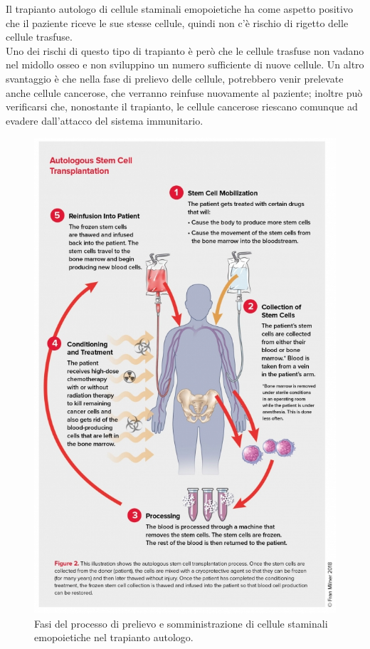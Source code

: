 Il trapianto autologo di cellule staminali emopoietiche ha come aspetto positivo che il paziente riceve le sue 
stesse cellule, quindi non c’è rischio di rigetto delle cellule trasfuse.\\ 
Uno dei rischi di questo tipo di trapianto è però che le cellule trasfuse non vadano nel midollo osseo e non 
sviluppino un numero sufficiente di nuove cellule\cite{STEMCELLS}. Un altro svantaggio è che nella fase di prelievo delle 
cellule, potrebbero venir prelevate anche cellule cancerose, che verranno reinfuse nuovamente al paziente; inoltre può 
verificarsi che, nonostante il trapianto, le cellule cancerose riescano comunque ad evadere dall’attacco 
del sistema immunitario\cite{STEMCELLS}.

\begin{figure}[H]
    \begin{center}
    \includegraphics[width=0.7\columnwidth]{img/AUTOLOGO.jpeg}
    \vspace{-3mm}
    \end{center}
    \caption{Fasi del processo di prelievo e somministrazione di cellule staminali emopoietiche nel trapianto autologo.
    \cite{LLSBLOOD}}
    \label{fig:FIGURE_3.15}
\end{figure}

